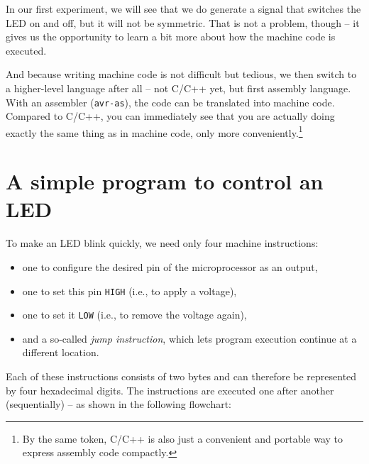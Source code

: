 \documentclass[a4paper,12pt]{article}
\begin{document}
In our first experiment, we will see that we do generate a signal that
switches the LED on and off, but it will not be symmetric. That is not a
problem, though – it gives us the opportunity to learn a bit more about how
the machine code is executed.

\newpage
And because writing machine code is not difficult but tedious, we then switch
to a higher-level language after all – not C/C++ yet, but first assembly
language. With an assembler (\texttt{avr-as}), the code can be translated
into machine code. Compared to C/C++, you can immediately see that you are
actually doing exactly the same thing as in machine code, only more
conveniently.\footnote{By the same token, C/C++ is also just a convenient
and portable way to express assembly code compactly.}

\newpage
\section{A simple program to control an LED}

To make an LED blink quickly, we need only four machine instructions:

\begin{itemize}
    \item
	one to configure the desired pin of the microprocessor as an output,
    \item
	one to set this pin \texttt{HIGH} (i.e., to apply a voltage),
    \item
	one to set it \texttt{LOW} (i.e., to remove the voltage again),
    \item
	and a so-called \emph{jump instruction}, which lets program execution
	continue at a different location.
\end{itemize}

\noindent
Each of these instructions consists of two bytes and can therefore be
represented by four hexadecimal digits. The instructions are executed one
after another (sequentially) – as shown in the following flowchart:


\begin{center}
\end{center}
\end{document}
